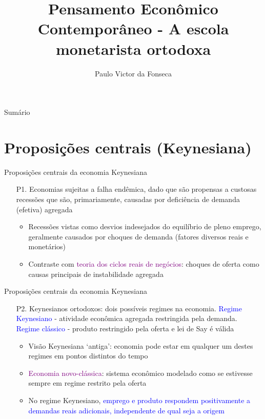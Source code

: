 \documentclass[10pt]{beamer}
\title[]{Pensamento Econômico Contemporâneo - A escola monetarista ortodoxa}
\author[]{Paulo Victor da Fonseca}
\date{}
\begin{document}
\begin{frame}[plain]
\end{frame}

\begin{frame}{Sumário}
    \tableofcontents
\end{frame}

\section{Proposições centrais (Keynesiana)}
\begin{frame}{Proposições centrais da economia Keynesiana}
    \begin{enumerate}
        \item[P1.] Economias sujeitas a falha endêmica, dado que são propensas a custosas recessões que são, primariamente, causadas por deficiência de demanda (efetiva) agregada
        \bigskip
        \begin{itemize}
            \item Recessões vistas como desvios indesejados do equilíbrio de pleno emprego, geralmente causados por choques de demanda (fatores diversos reais e monetários)
            \medskip
            \item Contraste com \textcolor{purple}{teoria dos ciclos reais de negócios}: choques de oferta como causas principais de instabilidade agregada
        \end{itemize}
    \end{enumerate}
\end{frame}

\begin{frame}{Proposições centrais da economia Keynesiana}
    \begin{enumerate}
        \item[P2.] Keynesianos ortodoxos: dois possíveis regimes na economia. \textcolor{blue}{Regime Keynesiano} - atividade econômica agregada restringida pela demanda. \textcolor{blue}{Regime clássico} - produto restringido pela oferta e lei de Say é válida
        \bigskip
        \begin{itemize}
            \item Visão Keynesiana `antiga': economia pode estar em qualquer um destes regimes em pontos distintos do tempo
            \medskip
            \item \textcolor{purple}{Economia novo-clássica}: sistema econômico modelado como se estivesse sempre em regime restrito pela oferta
            \medskip
            \item No regime Keynesiano, \textcolor{blue}{emprego e produto respondem positivamente a demandas reais adicionais, independente de qual seja a origem}
        \end{itemize}
    \end{enumerate}
\end{frame}
\end{document}
